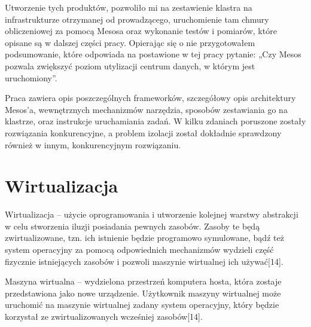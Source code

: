 \documentclass[10pt,a4paper,titlepage,twoside]{report}
\begin{document}
Utworzenie tych produktów, pozwoliło mi na zestawienie klastra na infrastrukturze otrzymanej od prowadzącego, uruchomienie tam chmury obliczeniowej za pomocą Mesosa oraz wykonanie testów i pomiarów, które opisane są w dalszej części pracy. Opierając się o nie przygotowałem podsumowanie, które odpowiada na postawione w tej pracy pytanie: „Czy Mesos pozwala zwiększyć poziom utylizacji centrum danych, w którym jest uruchomiony”.

Praca zawiera opis poszczególnych frameworków, szczegółowy opis architektury Mesos’a, wewnętrznych mechanizmów narzędzia, sposobów zestawiania go na klastrze, oraz instrukcje uruchamiania zadań. W kilku zdaniach poruszone zostały rozwiązania konkurencyjne, a problem izolacji został dokładnie sprawdzony również w innym, konkurencyjnym rozwiązaniu.

\section{Wirtualizacja}
\indent \indent Wirtualizacja – użycie oprogramowania i utworzenie kolejnej warstwy abstrakcji w celu stworzenia iluzji posiadania pewnych zasobów. Zasoby te będą zwirtualizowane, tzn. ich istnienie będzie programowo symulowane, bądź też system operacyjny za pomocą odpowiednich mechanizmów wydzieli część fizycznie istniejących zasobów i pozwoli maszynie wirtualnej ich używać[14].

Maszyna wirtualna – wydzielona przestrzeń komputera hosta, która zostaje przedstawiona jako nowe urządzenie. Użytkownik maszyny wirtualnej może uruchomić na maszynie wirtualnej zadany system operacyjny, który będzie korzystał ze zwirtualizowanych wcześniej zasobów[14].
\end{document}
